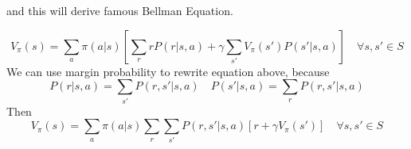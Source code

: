     and this will derive famous Bellman Equation.

    \begin{equation}
        V_{\pi}(s)=\sum_{a}\pi(a|s)[\sum_{r}rP(r|s,a)+\gamma\sum_{s'}V_{\pi}(s')P(s'|s,a)] \quad\forall s,s' \in S 
    \end{equation}
    We can use margin probability to rewrite equation above, because
    \begin{equation}
        P(r|s,a) = \sum_{s'}P(r,s'|s,a) \quad P(s'|s,a) = \sum_{r}P(r,s'|s,a)
    \end{equation}
    Then
    \begin{equation}\label{vs1}
        V_{\pi}(s)=\sum_{a}\pi(a|s)\sum_{r}\sum_{s'}P(r,s'|s,a)[r+\gamma V_{\pi}(s')] \quad\forall s,s' \in S
    \end{equation}

